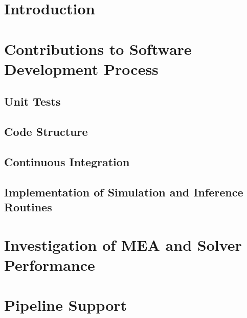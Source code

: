 \section{Introduction}
\section{Contributions to Software Development Process}
\subsection{Unit Tests}
\subsection{Code Structure}
\subsection{Continuous Integration}
\subsection{Implementation of Simulation and Inference Routines}
\section{Investigation of MEA and Solver Performance}
\section{Pipeline Support}
